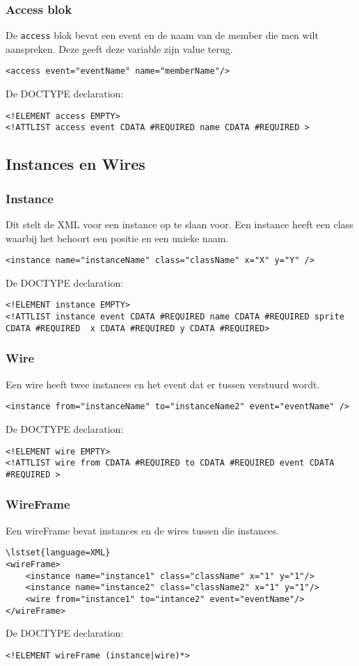 \documentclass[]{article}
\begin{document}
\subsubsection{Access blok}
De \texttt{access} blok bevat een event en de naam van de member die men wilt aanspreken.
Deze geeft deze variable zijn value terug.
\lstset{language=XML}
\begin{lstlisting}
<access event="eventName" name="memberName"/>
\end{lstlisting}
De DOCTYPE declaration: 
\lstset{language=XML}
\begin{lstlisting}
<!ELEMENT access EMPTY>
<!ATTLIST access event CDATA #REQUIRED name CDATA #REQUIRED >
\end{lstlisting}

\subsection{Instances en Wires}
\subsubsection{Instance }
Dit stelt de XML voor een instance op te slaan voor. Een instance heeft een class waarbij het behoort een positie en een unieke naam.
\lstset{language=XML}
\begin{lstlisting}
<instance name="instanceName" class="className" x="X" y="Y" />
\end{lstlisting}
De DOCTYPE declaration: 
\lstset{language=XML}
\begin{lstlisting}
<!ELEMENT instance EMPTY>
<!ATTLIST instance event CDATA #REQUIRED name CDATA #REQUIRED sprite			 CDATA #REQUIRED  x CDATA #REQUIRED y CDATA #REQUIRED>
\end{lstlisting}
\subsubsection{Wire}
Een wire heeft twee instances en het event dat er tussen verstuurd wordt.
\lstset{language=XML}
\begin{lstlisting}
<instance from="instanceName" to="instanceName2" event="eventName" />
\end{lstlisting}
De DOCTYPE declaration: 
\lstset{language=XML}
\begin{lstlisting}
<!ELEMENT wire EMPTY>
<!ATTLIST wire from CDATA #REQUIRED to CDATA #REQUIRED event CDATA #REQUIRED >
\end{lstlisting}
\subsubsection{WireFrame}
Een wireFrame bevat instances en de wires tussen die instances.
\begin{lstlisting}
\lstset{language=XML}
<wireFrame>
	<instance name="instance1" class="className" x="1" y="1"/>
	<instance name="instance2" class="className2" x="1" y="1"/>
	<wire from="instance1" to="intance2" event="eventName"/>
</wireFrame>	
\end{lstlisting}
De DOCTYPE declaration: 
\lstset{language=XML}
\begin{lstlisting}
<!ELEMENT wireFrame (instance|wire)*>
\end{lstlisting}
\end{document}
